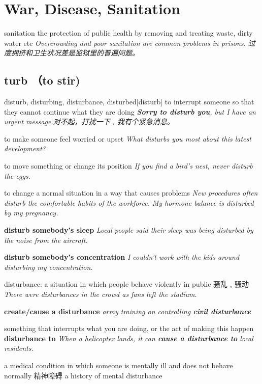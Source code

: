 \chapter{War, Disease, Sanitation}

\begin{RefWord}{sanitation}
    the protection of public health by removing and treating waste, dirty water etc
    \textit{Overcrowding and poor sanitation are common problems in prisons. 过度拥挤和卫生状况差是监狱里的普遍问题。}
\end{RefWord}

\section{turb （to stir)}

\begin{DefWord}{disturb, disturbing, disturbance, disturbed}[disturb]
    to interrupt someone so that they cannot continue what they are doing
    \textit{\textbf{Sorry to disturb you}, but I have an urgent message.对不起，打扰一下﹐我有个紧急消息。}

    to make someone feel worried or upset
    \textit{What disturbs you most about this latest development?}

    to move something or change its position
    \textit{If you find a bird’s nest, never disturb the eggs.}

    to change a normal situation in a way that causes problems
    \textit{New procedures often disturb the comfortable habits of the workforce.}
    \textit{My hormone balance is disturbed by my pregnancy.}


    \textbf{disturb somebody's sleep}
    \textit{Local people said their sleep was being disturbed by the noise from the aircraft.}

    \textbf{disturb somebody's concentration}
    \textit{I couldn't work with the kids around disturbing my concentration.}

    disturbance: a situation in which people behave violently in public 骚乱﹐骚动
    \textit{There were disturbances in the crowd as fans left the stadium.}

    \textbf{create/cause a disturbance}
    \textit{army training on controlling \textbf{civil disturbance}}

    something that interrupts what you are doing, or the act of making this happen
    \textbf{disturbance to}
    \textit{When a helicopter lands, it can \textbf{cause a disturbance to} local residents.}

    a medical condition in which someone is mentally ill and does not behave normally 精神障碍
    a history of mental disturbance


\end{DefWord}

